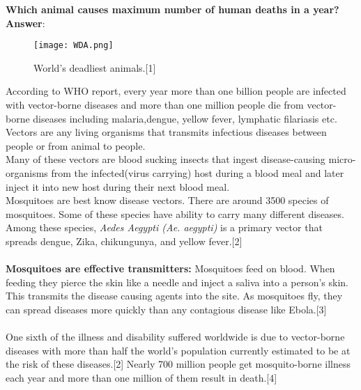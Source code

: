 \documentclass[11pt]{exam}
\begin{document}
\begin{questions}
\question
\label{Q1:Most lethal animal}

\textbf{Which animal causes maximum number of human deaths in a year?}  \\
\textbf{Answer}:

\begin{figure}[H]
  \centering
   \texttt{[image: WDA.png]}
  \caption{World's deadliest animals.[1]}
   \label{fig: World's deadliest animals }
\end{figure}
According to WHO report, every year more than one billion people are infected with vector-borne diseases and more than one million people die from vector-borne diseases including malaria,dengue, yellow fever, lymphatic filariasis etc. \\
Vectors are any living organisms that transmits infectious diseases between people or from animal to people.\\ %
Many of these vectors are blood sucking insects that ingest disease-causing micro-organisms from the infected(virus carrying) host during a blood meal and later inject it into new host during their next blood meal.     \\
Mosquitoes are best know disease vectors. There are around 3500 species of mosquitoes. Some of these species have ability to carry many different diseases.\\
Among these species, \textit{Aedes Aegypti (Ae. aegypti)} is a primary vector that spreads dengue, Zika, chikungunya, and yellow fever.[2]\\ \\
\textbf{Mosquitoes are effective transmitters:} Mosquitoes feed on blood. When feeding they pierce the skin like a needle and inject a saliva into a person's skin. This transmits the disease causing agents into the site. As mosquitoes fly, they can spread diseases more quickly than any contagious disease like Ebola.[3] \\ \\
One sixth of the illness and disability suffered worldwide is due to vector-borne diseases with more than half the world's population currently estimated to be at the risk of these diseases.[2]  
Nearly 700 million people get mosquito-borne illness each year and more than one million of them result in death.[4] \\ 


\end{questions}
\end{document}
